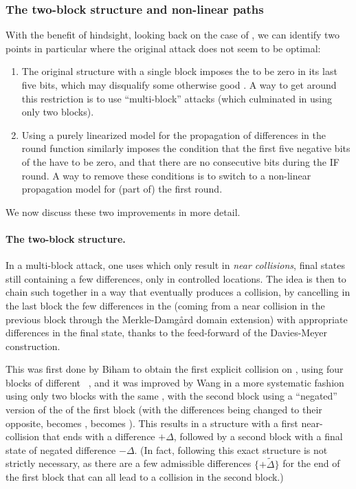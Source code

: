 \subsubsection{The two-block structure and non-linear paths}
\label{sec:nl_struct}
With the benefit of hindsight, looking back on the case of \shazero, we can identify two points in particular where the original attack does not seem to be optimal:
\begin{enumerate}
\item The original structure with a single block imposes the \dv to be zero in its last five bits, which may disqualify some otherwise good
\dvs. A way to get around this restriction is to use ``multi-block'' attacks (which culminated in using only two blocks).
\item Using a purely linearized model for the propagation of differences in the round function similarly imposes the condition that the first
five negative bits of the \dv have to be zero, and that there are no consecutive bits during the IF round. A way to remove these conditions
is to switch to a non-linear propagation model for (part of) the first round.
\end{enumerate}
We now discuss these two improvements in more detail.

\paragraph{The two-block structure.}
In a multi-block attack, one uses \dvs which only result in \emph{near collisions},
\ie final states still containing a few differences, only in controlled locations. The idea is then to chain such \dvs together in a way
that eventually produces a collision, by cancelling in the last block the few differences in the \iv (coming from a near collision in the previous block
through the Merkle-Damg\aa rd domain extension) with appropriate differences in the final state, thanks to the feed-forward of the
Davies-Meyer construction.

This was first done by Biham \etal to obtain the first explicit collision on \shazero, using four blocks of different
\dvs~\cite{DBLP:conf/eurocrypt/BihamCJCLJ05},
and it was improved by Wang \etal in a more systematic fashion using only two blocks with the same \dv, with the second block using a ``negated'' version
of the \dv of the first block (\ie with the differences being changed to their opposite, \eg \onediffu becomes \onediffd, \nodiffo becomes \nodiffz).
This results in a structure with a first near-collision that ends with a difference $+\Delta$, followed by a second block with a final state
of negated difference $-\Delta$. (In fact,
following this exact structure is not strictly necessary, as there are a few admissible differences $\{+\widetilde{\Delta}\}$ for the end of the first block
that can all lead to a collision in the second block.)

